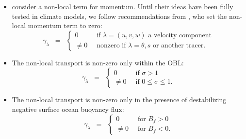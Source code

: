 \begin{itemize}

\item \cite{Smyth_etal2002} consider a non-local term for momentum.
  Until their ideas have been fully tested in climate models, we
  follow recommendations from \cite{LargeKPP}, who set the non-local
  momentum term to zero:
\begin{equation}
 \gamma_{\lambda} \; \; = \; \; 
\left\{
 \begin{array}{ll}
  0 \; \;  &\mbox{if $\lambda = (u,v,w)$ a velocity component}
 \\
  \ne 0 \; \; &\mbox{nonzero if $\lambda = \theta,s$ or another tracer.}
  \end{array}
 \right.
\end{equation}

  \item The non-local transport is non-zero only within the OBL:  
\begin{equation}
 \gamma_{\lambda} \; \; = \; \; 
  \left\{ 
  \begin{array}{ll}
   0 \; \; &\mbox{if $\sigma > 1$}
   \\ 
   \ne 0  \; \; &\mbox{if $0 \le \sigma \le 1$.}
  \end{array}
 \right.
\end{equation}

  \item The non-local transport is non-zero only in the presence of
    destabilizing negative surface ocean buoyancy flux:
\begin{equation}
 \gamma_{\lambda} \; \; = \; \; 
  \left\{ 
  \begin{array}{ll}
   0 \; \; &\mbox{for $B_{f} > 0$}
   \\ 
   \ne 0 \; \; &\mbox{for $B_{f} < 0$.}
  \end{array}
 \right.
\end{equation}



\end{itemize}
